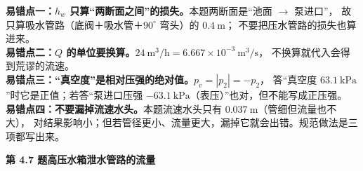 \begin{yicuo}
\textbf{易错点一：$h_w$ 只算“两断面之间”的损失。}本题两断面是“池面 $\to$ 泵进口”，
故只算吸水管路（底阀＋吸水管＋$90^\circ$ 弯头）的 $0.4\ \mathrm{m}$；
不要把压水管路的损失也算进来。\\
\textbf{易错点二：$Q$ 的单位要换算。}$24\ \mathrm{m^3/h}=6.667\times10^{-3}\ \mathrm{m^3/s}$，
不换算就代入会得到荒谬的流速。\\
\textbf{易错点三：“真空度”是相对压强的绝对值。}$p_v=|p_2|=-p_2$，
答“真空度 $63.1\ \mathrm{kPa}$”时它是正值；若答“泵进口压强 $-63.1\ \mathrm{kPa}$（表压）”也对，但不能写成正压强。\\
\textbf{易错点四：不要漏掉流速水头。}本题流速水头只有 $0.037\ \mathrm{m}$（管细但流量也不大），
对结果影响小；但若管径更小、流量更大，漏掉它就会出错。规范做法是三项都写出来。
\end{yicuo}

\noindent\textbf{第 4.7 题\quad 高压水箱泄水管路的流量}

